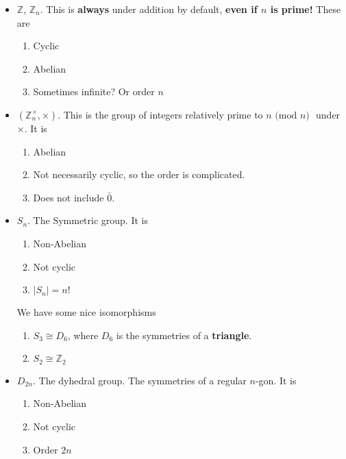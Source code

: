 \documentclass[12pt]{article}
\def\Z{{\mathbb Z}}
\renewcommand{\mod}[1]{\text{ (mod $#1$) }}
\theoremstyle{remark}
\theoremstyle{remark}
\theoremstyle{remark}
\theoremstyle{remark}
\theoremstyle{remark}
\begin{document}
\begin{itemize}
  \item $\Z$, $\Z_n$. This is {\bf always} under addition by default, {\bf even
    if $n$ is prime!} These are

    \begin{enumerate}
      \item Cyclic
      \item Abelian
      \item Sometimes infinite? Or order $n$
    \end{enumerate}


  \item $(\Z_n^\times, \times)$. This is the group of integers relatively prime
    to $n \mod n$ under $\times$. It is

    \begin{enumerate}
      \item Abelian
      \item Not necessarily cyclic, so the order is complicated.
      \item Does not include $\bar 0$.
    \end{enumerate}

  \item $S_n$. The Symmetric group. It is

    \begin{enumerate}
      \item Non-Abelian
      \item Not cyclic
      \item $|S_n| = n!$
    \end{enumerate}

    We have some nice isomorphisms

    \begin{enumerate}
      \item $S_3 \cong D_6$, where $D_6$ is the symmetries of a {\bf triangle}.
      \item $S_2 \cong \Z_2$
    \end{enumerate}

  \item $D_{2n}$. The dyhedral group. The symmetries of a regular $n$-gon. It is

    \begin{enumerate}
      \item Non-Abelian
      \item Not cyclic
      \item Order $2n$
    \end{enumerate}


\end{itemize}
\end{document}
